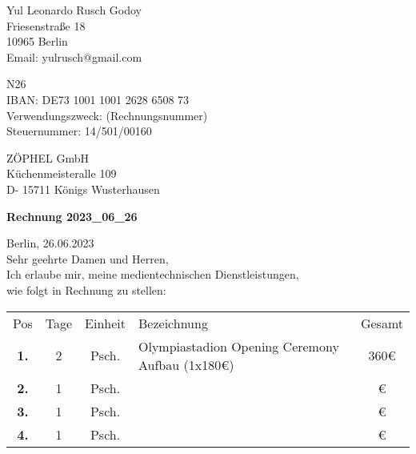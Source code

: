 \documentclass[12pt]{article}
\begin{document}

\begin{flushright}

Yul Leonardo Rusch Godoy\\
Friesenstraße 18\\
10965 Berlin\\
Email: yulrusch@gmail.com\\

\vspace{0.5cm}

N26\\
IBAN: DE73 1001 1001 2628 6508 73\\
Verwendungszweck: (Rechnungsnummer)\\
Steuernummer: 14/501/00160\\

\end{flushright}

\vspace{0.5cm}

\begin{flushleft}

ZÖPHEL GmbH\\
Küchenmeisteralle 109\\
D- 15711 Königs Wusterhausen\\

\vspace{2cm}

\textbf{Rechnung 2023\_06\_26\\}

\vspace{0.5cm}

Berlin, 26.06.2023\\
Sehr geehrte Damen und Herren,\\
Ich erlaube mir, meine medientechnischen Dienstleistungen,\\
wie folgt in Rechnung zu stellen:\\

\end{flushleft}

\begin{flushleft}
\begin{tabular}{c c c p{9.7cm} c}
Pos & Tage & Einheit & Bezeichnung & Gesamt\\ 
\rowcolor{lightgrey}
\textbf{1.} & 2 & Psch. & Olympiastadion Opening Ceremony Aufbau (1x180€) & 360€\\ 
\textbf{2.} & 1 & Psch. &  & €\\ 
\rowcolor{lightgrey}
\textbf{3.} & 1 & Psch. &  & €\\ 
\textbf{4.} & 1 & Psch. &  & €\\ 
\end{tabular}        
\end{flushleft}
\end{document}
